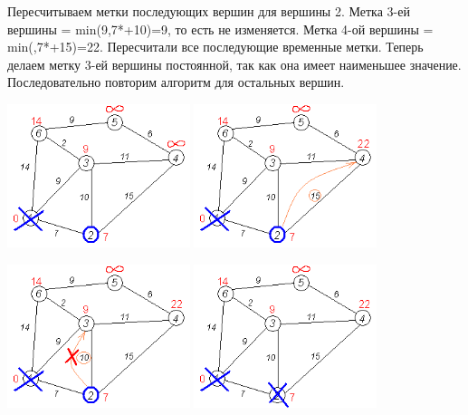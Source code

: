 \documentclass[12pt, a4paper, oneside]{article}
\theoremstyle{plain} %
\theoremstyle{definition}
\begin{document}
Пересчитываем метки последующих вершин для вершины 2. Метка 3-ей вершины = min(9,7*+10)=9, то есть не изменяется. Метка 4-ой вершины = min(\infty,7*+15)=22. Пересчитали все последующие временные метки. Теперь делаем метку 3-ей вершины постоянной, так как она имеет наименьшее значение. Последовательно повторим алгоритм для остальных вершин.

\includegraphics[width=0.4\textwidth]{Dijkstra/Dijkstra_graph7.png}
\includegraphics[width=0.4\textwidth]{Dijkstra/Dijkstra_graph8.png}

\includegraphics[width=0.4\textwidth]{Dijkstra/Dijkstra_graph9.png}
\includegraphics[width=0.4\textwidth]{Dijkstra/Dijkstra_graph10.png}
\end{document}
